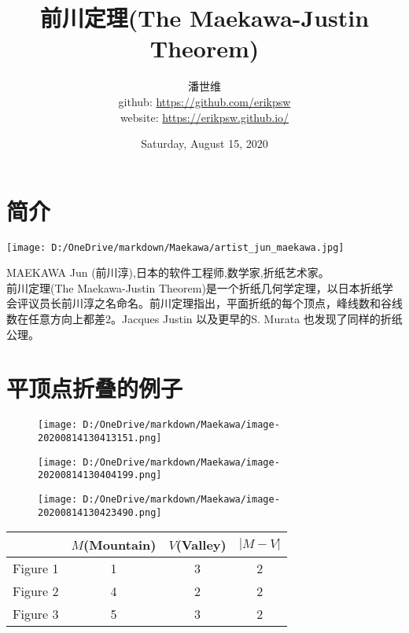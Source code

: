 \documentclass[a4paper,12pt]{article}
\begin{document}
\title {前川定理(The Maekawa-Justin Theorem)}
\author{潘世维\\github: \url{https://github.com/erikpsw}\\website: \url{https://erikpsw.github.io/}}
\date{Saturday, August 15, 2020}
\maketitle
\tableofcontents 
\section{简介} 
\begin{center}
    \texttt{[image: D:/OneDrive/markdown/Maekawa/artist\_jun\_maekawa.jpg]}
\end{center}


MAEKAWA Jun (前川淳),日本的软件工程师,数学家,折纸艺术家。\\[3pt]
前川定理(The Maekawa-Justin Theorem)是一个折纸几何学定理，以日本折纸学会评议员长前川淳之名命名。前川定理指出，平面折纸的每个顶点，峰线数和谷线数在任意方向上都差2。Jacques Justin 以及更早的S. Murata 也发现了同样的折纸公理。
\newpage
\section{平顶点折叠的例子}  
\begin{flushright}
\begin{figure}[h]
    \centering 
    \begin{minipage}{0.4\linewidth}
    \centering    %
    \texttt{[image: D:/OneDrive/markdown/Maekawa/image-20200814130413151.png]}	 
    \caption{}
    \end{minipage}
    \hfill
    \begin{minipage}{0.4\linewidth}
    \centering    %
    \texttt{[image: D:/OneDrive/markdown/Maekawa/image-20200814130404199.png]}
    \caption{}
    \end{minipage}
    \texttt{[image: D:/OneDrive/markdown/Maekawa/image-20200814130423490.png]}
    \caption{}
\end{figure}
\end{flushright}

\begin{table}[!htbp]
    \centering
    \begin{tabular}{|l|c|l|l|c|l|c|}
    \hline
     & \multicolumn{3}{c|}{$M$(Mountain)} & \multicolumn{2}{c|}{$V$(Valley)} & \multicolumn{1}{l|}{$|M-V|$} \\ \hline
    Figure 1 & \multicolumn{3}{c|}{1} & \multicolumn{2}{c|}{3} & {\color[HTML]{9A0000} 2} \\ \hline
    Figure 2 & \multicolumn{3}{c|}{4} & \multicolumn{2}{c|}{2} & {\color[HTML]{9A0000} 2} \\ \hline
    Figure 3 & \multicolumn{3}{c|}{5} & \multicolumn{2}{c|}{3} & {\color[HTML]{9A0000} 2} \\ \hline
    \end{tabular}
\end{table}
      
\end{document}
